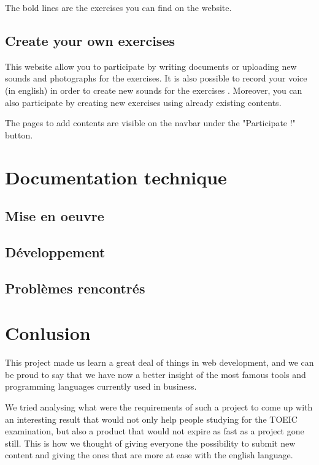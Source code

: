 \documentclass[12pt,a4paper]{report}
\begin{document}
The bold lines are the exercises you can find on the website.

\subsection{Create your own exercises}

This website allow you to participate by writing documents or uploading new sounds and photographs for the exercises. It is also possible to record your voice (in english) in order to create new sounds for the exercises . Moreover, you can also participate by creating new exercises using already existing contents.

The pages to add contents are visible on the navbar under the "Participate !" button.

\pagebreak

\section{Documentation technique}
\subsection{Mise en oeuvre}

\subsection{Développement}
\subsection{Problèmes rencontrés}


\section*{Conlusion}
This project made us learn a great deal of things in web development, and we
can be proud to say that we have now a better insight of the most famous tools
and programming languages currently used in business.
 
We tried analysing what were the requirements of such a project to come up with
an interesting result that would not only help people studying for the TOEIC
examination, but also a product that would not expire as fast as a project gone
still. This is how we thought of giving everyone the possibility to submit new
content and giving the ones that are more at ease with the english language.


\end{document}
